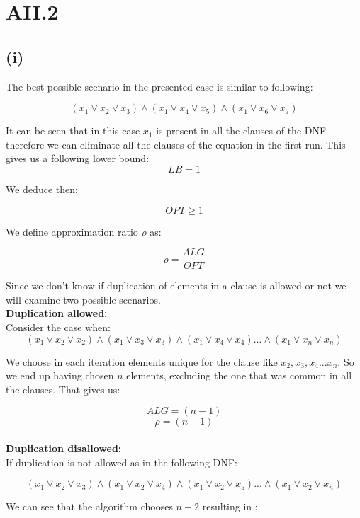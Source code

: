 \section* {AII.2}
\label {a2-2}
\subsection*{(i)}

The best possible scenario in the presented case is similar to following:

$$ (x_1 \vee x_2  \vee x_3) \wedge (x_1 \vee x_4 \vee x_5) \wedge (x_1 \vee x_6 \vee x_7) $$

It can be seen that in this case $ x_1 $ is present in all the clauses of the DNF therefore we can eliminate all the clauses of the equation in the first run. This gives us a following lower bound:
$$ LB = 1 $$ 

We deduce then:

$$ OPT \ge 1 $$

We define approximation ratio $ \rho $ as:

$$ \rho = \frac{ALG}{OPT} $$

Since we don't know if duplication of elements in a clause is allowed or not we will examine two possible scenarios.\\

\textbf{Duplication allowed:}\\

Consider the case when:\\

$$ (x_1 \vee x_2  \vee x_2) \wedge (x_1 \vee x_3 \vee x_3) \wedge (x_1 \vee x_4 \vee x_4) ... \wedge (x_1 \vee x_n \vee x_n) $$

We choose in each iteration elements unique for the clause like $ x_2 , x_3 , x_4 ... x_n $. So we end up having chosen $ n $ elements, excluding the one that was common in all the clauses. That gives us:

$$ ALG = (n-1) $$ 
$$ \rho = (n-1) $$ \\

\textbf{Duplication disallowed:}\\

If duplication is not allowed as in the following DNF:

$$ (x_1 \vee x_2  \vee x_3) \wedge (x_1 \vee x_2 \vee x_4) \wedge (x_1 \vee x_2 \vee x_5) ... \wedge (x_1 \vee x_2 \vee x_n) $$

We can see that the algorithm chooses $ n-2 $ resulting in :

